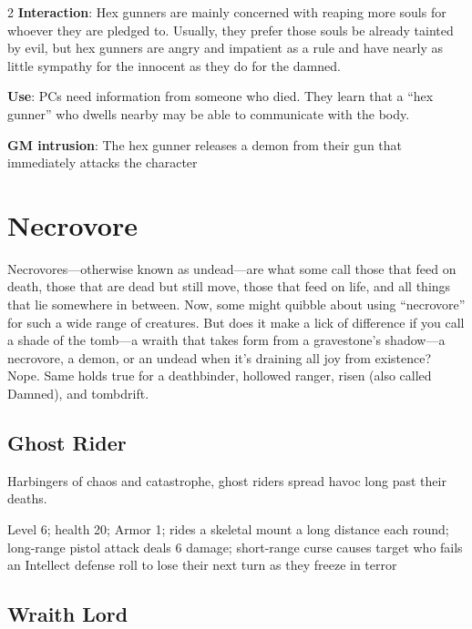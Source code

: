 \begin{multicols}{2}
\textbf{Interaction}: Hex gunners are mainly concerned with reaping more souls for whoever they are pledged to. Usually, they prefer those souls be already tainted by evil, but hex gunners are angry and impatient as a rule and have nearly as little sympathy for the innocent as they do for the damned. 

\textbf{Use}: PCs need information from someone who died. They learn that a “hex gunner” who dwells nearby may be able to communicate with the body.

\textbf{GM intrusion}: The hex gunner releases a demon from their gun that immediately attacks the character

\section{Necrovore}

Necrovores—otherwise known as undead—are what some call those that feed on death, those that are dead but still move, those that feed on life, and all things that lie somewhere in between. Now, some might quibble about using “necrovore” for such a wide range of creatures. But does it make a lick of difference if you call a shade of the tomb—a wraith that takes form from a gravestone’s shadow—a necrovore, a demon, or an undead when it’s draining all joy from existence? Nope. Same holds true for a deathbinder, hollowed ranger, risen (also called Damned), and tombdrift.

\subsection{Ghost Rider}

Harbingers of chaos and catastrophe, ghost riders spread havoc long past their deaths. 

Level 6; health 20; Armor 1; rides a skeletal mount a long distance each round; long-range pistol attack deals 6 damage; short-range curse causes target who fails an Intellect defense roll to lose their next turn as they freeze in terror 

\subsection{Wraith Lord}


\end{multicols}
